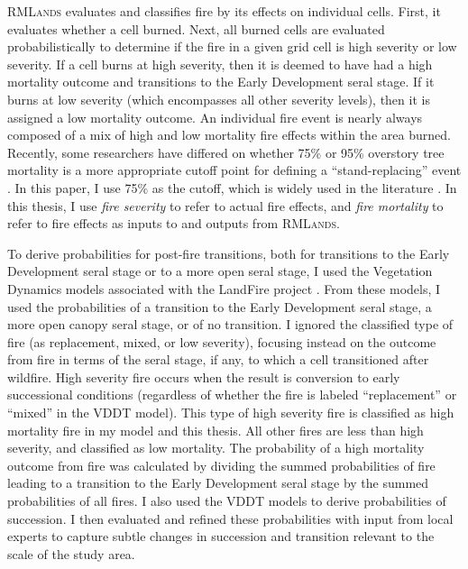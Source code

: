 \textsc{RMLands} evaluates and classifies fire by its effects on individual cells. First, it evaluates whether a cell burned. Next, all burned cells are evaluated probabilistically to determine if the fire in a given grid cell is high severity or low severity. If a cell burns at high severity, then it is deemed to have had a high mortality outcome and transitions to the Early Development seral stage. If it burns at low severity (which encompasses all other severity levels), then it is assigned a low mortality outcome. An individual fire event is nearly always composed of a mix of high and low mortality fire effects within the area burned. Recently, some researchers have differed on whether 75\% or 95\% overstory tree mortality is a more appropriate cutoff point for defining a ``stand-replacing'' event \citep{Fule2014,Mallek2013}. In this paper, I use 75\% as the cutoff, which is widely used in the literature \citep{Agee1993,Agee2007,Miller2009,Baker2014}. In this thesis, I use \emph{fire severity} to refer to actual fire effects, and \emph{fire mortality} to refer to fire effects as inputs to and outputs from \textsc{RMLands}.

To derive probabilities for post-fire transitions, both for transitions to the Early Development seral stage or to a more open seral stage, I used the Vegetation Dynamics models associated with the LandFire project \citep{Landfire2007}. From these models, I used the probabilities of a transition to the Early Development seral stage, a more open canopy seral stage, or of no transition. I ignored the classified type of fire (as replacement, mixed, or low severity), focusing instead on the outcome from fire in terms of the seral stage, if any, to which a cell transitioned after wildfire. High severity fire occurs when the result is conversion to early successional conditions (regardless of whether the fire is labeled ``replacement'' or ``mixed'' in the VDDT model). This type of high severity fire is classified as high mortality fire in my model and this thesis. All other fires are less than high severity, and classified as low mortality. The probability of a high mortality outcome from fire was calculated by dividing the summed probabilities of fire leading to a transition to the Early Development seral stage by the summed probabilities of all fires.  I also used the VDDT models to derive probabilities of succession. I then evaluated and refined these probabilities with input from local experts to capture subtle changes in succession and transition relevant to the scale of the study area.

